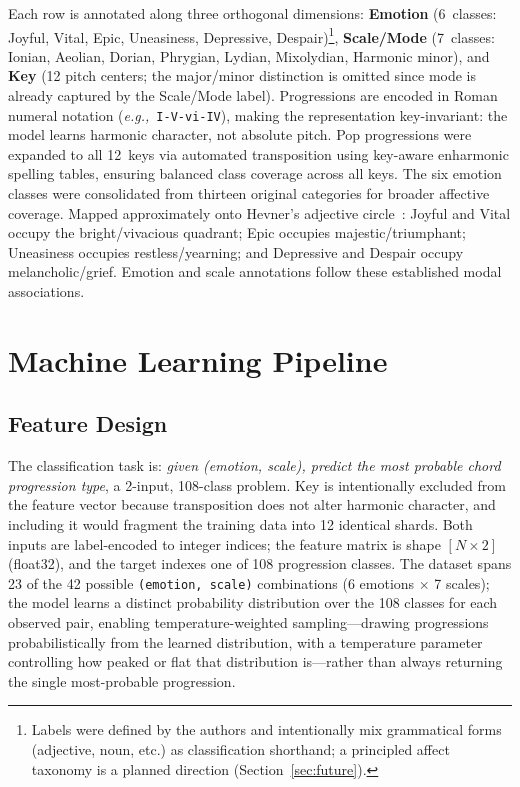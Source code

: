 \documentclass[runningheads,a4paper]{llncs}
\begin{document}
Each row is annotated along three orthogonal dimensions: \textbf{Emotion}
(6~classes: Joyful, Vital, Epic, Uneasiness, Depressive, Despair)\footnote{Labels
were defined by the authors and intentionally mix grammatical forms (adjective,
noun, etc.) as classification shorthand; a principled affect taxonomy is a
planned direction (Section~\ref{sec:future}).},
\textbf{Scale/Mode} (7~classes: Ionian, Aeolian, Dorian, Phrygian, Lydian,
Mixolydian, Harmonic minor), and \textbf{Key} (12 pitch centers; the
major/minor distinction is omitted since mode is already captured by the
Scale/Mode label).
Progressions are encoded in Roman numeral notation (\textit{e.g.,}~\texttt{I-V-vi-IV}),
making the representation key-invariant: the model learns harmonic character,
not absolute pitch. Pop progressions were expanded to all 12~keys via automated
transposition using key-aware enharmonic spelling tables, ensuring balanced class
coverage across all keys. The six emotion classes were consolidated from thirteen original categories for
broader affective coverage. Mapped approximately onto Hevner's adjective circle~\cite{hevner1935}:
Joyful and Vital occupy the bright/vivacious quadrant; Epic occupies
majestic/triumphant; Uneasiness occupies restless/yearning; and Depressive
and Despair occupy melancholic/grief. Emotion and scale annotations follow these
established modal associations.


\section{Machine Learning Pipeline}

\subsection{Feature Design}

The classification task is: \emph{given (emotion, scale), predict the most
probable chord progression type}, a 2-input, 108-class problem. Key is
intentionally excluded from the feature vector because transposition does not
alter harmonic character, and including it would fragment the training data into
12 identical shards. Both inputs are label-encoded to integer indices;
the feature matrix is shape $[N \times 2]$ (float32), and the target indexes
one of 108 progression classes. The dataset spans 23 of the 42 possible
\texttt{(emotion, scale)} combinations (6 emotions $\times$ 7 scales); the model learns a distinct probability
distribution over the 108 classes for each observed pair, enabling
temperature-weighted sampling---drawing progressions probabilistically from the
learned distribution, with a temperature parameter controlling how peaked or
flat that distribution is---rather than always returning the single
most-probable progression.
\end{document}
